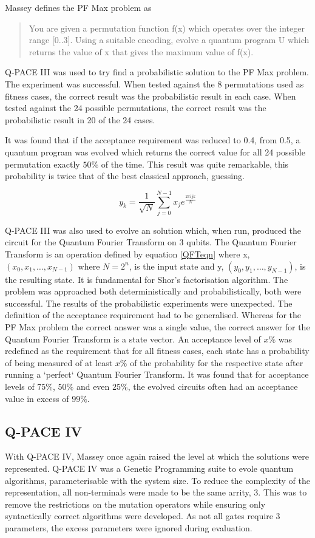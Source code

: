 \documentclass[authoryearcitations]{UoYCSproject}
\begin{document}
Massey defines the PF Max problem as
\begin{quote}
 You are given a permutation function f(x) which operates over the integer range [0..3].
Using a suitable encoding, evolve a quantum program U which returns the value of x that gives the maximum value of f(x).\cite{masseythesis}
\end{quote}
Q-PACE III was used to try find a probabilistic solution to the PF Max problem.
The experiment was successful.
When tested against the 8 permutations used as fitness cases, the correct result was the probabilistic result in each case.
When tested against the 24 possible permutations, the correct result was the probabilistic result in 20 of the 24 cases.

It was found that if the acceptance requirement was reduced to 0.4, from 0.5, a quantum program was evolved which returns the correct value for all 24 possible permutation exactly $50\%$ of the time.
This result was quite remarkable, this probability is twice that of the best classical approach, guessing.

\begin{equation}
 y_k = \frac{1}{\sqrt{N}} \sum_{j=0}^{N-1}{x_j}e^{\frac{2\pi{ijk}}{N}}
\label{QFTeqn}
\end{equation}

Q-PACE III was also used to evolve an solution which, when run, produced the circuit for the Quantum Fourier Transform on 3 qubits.
The Quantum Fourier Transform is an operation defined by equation \ref{QFTeqn} where x, $(x_0, x_1, \ldots, x_{N-1})$ where $N = 2^n$, is the input state and y, $(y_0, y_1, \ldots, y_{N-1})$, is the resulting state.
It is fundamental for Shor's factorisation algorithm.
The problem was approached both deterministically and probabilistically, both were successful.
The results of the probabilistic experiments were unexpected.
The definition of the acceptance requirement had to be generalised.
Whereas for the PF Max problem the correct answer was a single value, the correct answer for the Quantum Fourier Transform is a state vector.
An acceptance level of $x\%$ was redefined as the requirement that for all fitness cases, each state has a probability of being measured of at least $x\%$ of the probability for the respective state after running a `perfect` Quantum Fourier Transform.
It was found that for acceptance levels of $75\%$, $50\%$ and even $25\%$, the evolved circuits often had an acceptance value in excess of $99\%$.

\subsection{Q-PACE IV}
With Q-PACE IV, Massey once again raised the level at which the solutions were represented.
Q-PACE IV was a Genetic Programming suite to evole quantum algorithms, parameterisable with the system size.
To reduce the complexity of the representation, all non-terminals were made to be the same arrity, 3.
This was to remove the restrictions on the mutation operators while ensuring only syntactically correct algorithms were developed.
As not all gates require 3 parameters, the excess parameters were ignored during evaluation.
\end{document}
